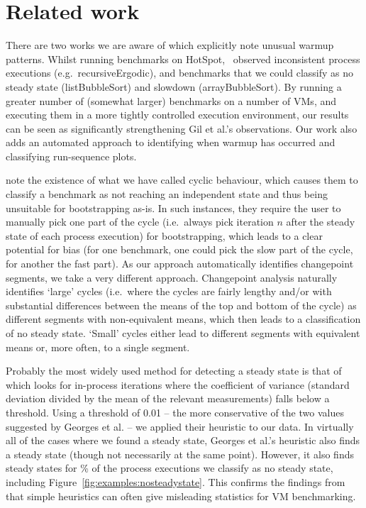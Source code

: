\documentclass[acmsmall,screen]{acmart}
\begin{document}
\section{Related work}
\label{sec:related}

There are two works we are aware of which explicitly note unusual warmup
patterns. Whilst running benchmarks on HotSpot,~\citet{gil11microbenchmark}
observed inconsistent process executions
(e.g.~recursiveErgodic), and benchmarks that we could classify as no
steady state (listBubbleSort) and slowdown (arrayBubbleSort). By running a
greater number of (somewhat larger) benchmarks on a number of VMs, and executing
them in a more tightly controlled execution environment, our results can be seen
as significantly strengthening Gil et al.'s observations. Our work also adds an
automated approach to identifying when warmup has occurred and classifying
run-sequence plots.

\cite{kalibera13rigorous} note the existence of what we have called cyclic behaviour, which
causes them to classify a benchmark as not reaching an independent state and
thus being unsuitable for bootstrapping as-is. In such instances, they require
the user to manually pick one part of the cycle (i.e.~always pick iteration $n$
after the steady state of each process execution) for bootstrapping, which leads
to a clear potential for bias (for one benchmark, one could pick the slow part
of the cycle, for another the fast part). As our approach automatically
identifies changepoint segments, we take a very different approach. Changepoint
analysis naturally identifies `large' cycles (i.e.~where the cycles are fairly
lengthy and/or with substantial differences between the means of the top and
bottom of the cycle) as different segments with non-equivalent means, which then
leads to a classification of no steady state. `Small' cycles either lead to
different segments with equivalent means or, more often, to a single segment.

Probably the most widely used method for detecting a steady state is that of
\citet{georges07statistically} which looks for in-process iterations where the
coefficient of variance (standard deviation divided by the mean of the relevant measurements)
falls below a threshold. Using a threshold of 0.01 -- the more
conservative of the two values suggested by Georges et al. -- we applied their
heuristic to our data. In virtually all of the cases where we found a steady
state, Georges et al.'s heuristic also finds a steady state (though not
necessarily at the same point). However, it also
finds steady states for \georgesnosteadystatepercent\% of the process executions we classify as no
steady state, including Figure~\ref{fig:examples:nosteadystate}. This confirms
the findings from \cite{kalibera13rigorous} that simple heuristics can often
give misleading statistics for VM benchmarking.
\end{document}
